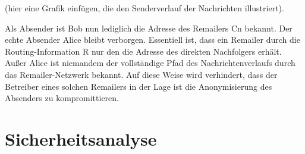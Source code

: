 (hier eine Grafik einfügen, die den  Senderverlauf der Nachrichten illustriert).

Als Absender ist Bob nun lediglich die Adresse des Remailers Cn bekannt. Der echte Absender Alice bleibt verborgen.
Essentiell ist, dass ein Remailer durch die Routing-Information R nur den die Adresse des direkten Nachfolgers erhält. Außer Alice ist niemandem der vollständige Pfad des Nachrichtenverlaufs durch das Remailer-Netzwerk bekannt. Auf diese Weise wird verhindert, dass der Betreiber eines solchen Remailers in der Lage ist die Anonymisierung des Absenders zu kompromittieren.

\section{Sicherheitsanalyse}
